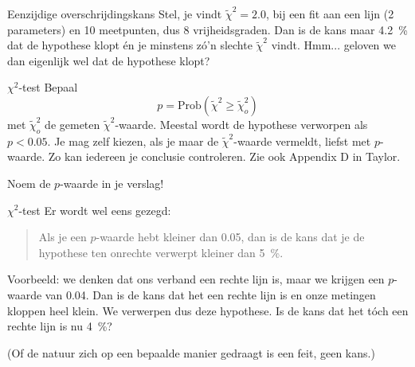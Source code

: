 \documentclass{beamer}
\newcommand{\rchisq}{\tilde\chi^2}
\begin{document}
\begin{frame}{Eenzijdige overschrijdingskans}
  Stel, je vindt $\rchisq = \num{2,0}$, bij een fit aan een lijn (2 parameters) en 10 meetpunten, dus 8 vrijheidsgraden. Dan is de kans maar \SI{4,2}{\percent} dat de hypothese klopt én je minstens zó'n slechte $\rchisq$ vindt. Hmm... geloven we dan eigenlijk wel dat de hypothese klopt?
\end{frame}

\begin{frame}{$\chi^2$-test}
  Bepaal
  \begin{equation*}
    p = \text{Prob}(\rchisq \geq \rchisq_o)
  \end{equation*}
  met $\rchisq_o$ de gemeten $\rchisq$-waarde. Meestal wordt de hypothese verworpen als $p < \num{0,05}$. Je mag zelf kiezen, als je maar de $\rchisq$-waarde vermeldt, liefst met $p$-waarde. Zo kan iedereen je conclusie controleren.
  \pause
  \alert{Zie ook Appendix D in Taylor.}

  \pause
  \alert{Noem de $p$-waarde in je verslag!}
\end{frame}

\begin{frame}{$\chi^2$-test}
  Er wordt wel eens gezegd:
  \begin{quote}
    Als je een $p$-waarde hebt kleiner dan \num{0,05}, dan is de kans dat je de hypothese \alert{ten onrechte} verwerpt kleiner dan \SI{5}{\percent}.
  \end{quote}

  \pause
  Voorbeeld: we denken dat ons verband een rechte lijn is, maar we krijgen een $p$-waarde van \num{0,04}. Dan is de kans dat het een rechte lijn is \alert{en onze metingen kloppen} heel klein. We verwerpen dus deze hypothese. Is de kans dat het tóch een rechte lijn is nu \SI{4}{\percent}?

  \pause

  \pause
  (Of de natuur zich op een bepaalde manier gedraagt is een \alert{feit}, geen kans.)
\end{frame}
\end{document}
